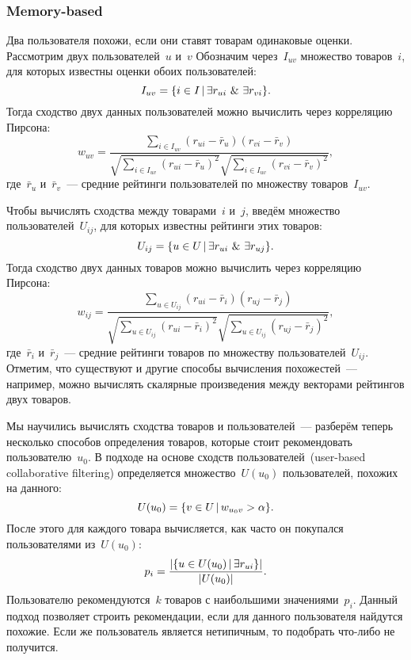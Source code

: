 \documentclass[12pt,fleqn]{article}
\begin{document}
\subsubsection{Memory-based}
Два пользователя похожи, если они ставят товарам одинаковые оценки.
Рассмотрим двух пользователей~$u$ и~$v$
Обозначим через~$I_{uv}$ множество товаров~$i$, для которых известны
оценки обоих пользователей:
\[
    I_{uv}
    =
    \{
        i \in I
        \cond
        \exists r_{ui}
        \ \&\ 
        \exists r_{vi}
    \}.
\]
Тогда сходство двух данных пользователей можно вычислить через корреляцию Пирсона:
\[
    w_{uv}
    =
    \frac{
        \sum_{i \in I_{uv}}
            (r_{ui} - \bar r_u)
            (r_{vi} - \bar r_v)
    }{
        \sqrt{
        \sum_{i \in I_{uv}}
            (r_{ui} - \bar r_u)^2
        }
        \sqrt{
        \sum_{i \in I_{uv}}
            (r_{vi} - \bar r_v)^2
        }
    },
\]
где~$\bar r_u$ и~$\bar r_v$~--- средние рейтинги пользователей по множеству товаров~$I_{uv}$.

Чтобы вычислять сходства между товарами~$i$ и~$j$, введём множество пользователей~$U_{ij}$,
для которых известны рейтинги этих товаров:
\[
    U_{ij}
    =
    \{
        u \in U
        \cond
        \exists r_{ui}
        \ \&\ 
        \exists r_{uj}
    \}.
\]
Тогда сходство двух данных товаров можно вычислить через корреляцию Пирсона:
\[
    w_{ij}
    =
    \frac{
        \sum_{u \in U_{ij}}
            (r_{ui} - \bar r_i)
            (r_{uj} - \bar r_j)
    }{
        \sqrt{
        \sum_{u \in U_{ij}}
            (r_{ui} - \bar r_i)^2
        }
        \sqrt{
        \sum_{u \in U_{ij}}
            (r_{uj} - \bar r_j)^2
        }
    },
\]
где~$\bar r_i$ и~$\bar r_j$~--- средние рейтинги товаров по множеству пользователей~$U_{ij}$.
Отметим, что существуют и другие способы вычисления похожестей~---
например, можно вычислять скалярные произведения между векторами рейтингов двух товаров.

Мы научились вычислять сходства товаров и пользователей~---
разберём теперь несколько способов определения товаров, которые стоит
рекомендовать пользователю~$u_0$.
В подходе на основе сходств пользователей~(user-based collaborative filtering)
определяется множество~$U(u_0)$ пользователей, похожих на данного:
\[
    U(u_0)
    =
    \{v \in U
        \mspace{3mu}{|}\mspace{3mu}
        w_{u_0 v} > \alpha
    \}.
\]
После этого для каждого товара вычисляется, как часто он покупался пользователями из~$U(u_0)$:
\[
    p_{i}
    =
    \frac{
        |\{u \in U(u_0) \mspace{3mu}{|}\mspace{3mu} \exists r_{ui}\}|
    }{
        |U(u_0)|
    }.
\]
Пользователю рекомендуются~$k$ товаров с наибольшими значениями~$p_i$.
Данный подход позволяет строить рекомендации, если для данного пользователя найдутся похожие.
Если же пользователь является нетипичным, то подобрать что-либо не получится.
\end{document}
